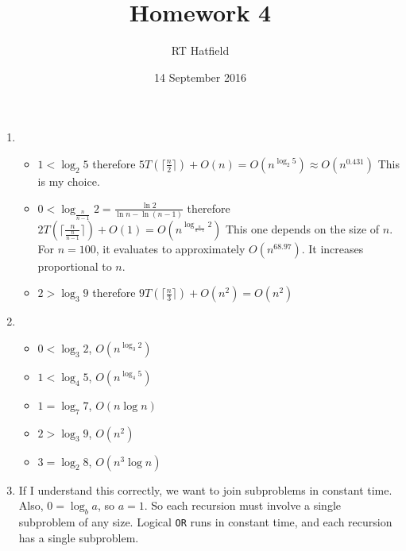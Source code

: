 \documentclass{article}
\title{Homework 4}
\author{RT Hatfield}
\date{14 September 2016}
\begin{document}
    \maketitle
    \begin{enumerate}
        \item \begin{itemize}
            \item $1 < \log_{2}{5}$ therefore $5T(\lceil\frac{n}{2}\rceil) + O(n) = O(n^{\log_{2}{5}}) \approx O(n^{0.431})$  This is my choice.
            \item $0 < \log_{\frac{n}{n-1}}{2} = \frac{\ln{2}}{\ln{n} - \ln{(n-1)}}$ therefore $2T(\lceil\frac{n}{\frac{n}{n-1}}\rceil) + O(1) = O(n^{\log_{\frac{n}{n-1}}{2}})$
            This one depends on the size of $n$.  For $n=100$, it evaluates to approximately $O(n^{68.97})$.  It increases proportional to $n$.
            \item $2 > \log_{3}{9}$ therefore $9T(\lceil\frac{n}{3}\rceil) + O(n^2) = O(n^2)$
        \end{itemize}
        \item \begin{itemize}
            \item $0 < \log_{3}{2}$, $O(n^{\log_{3}{2}})$
            \item $1 < \log_{4}{5}$, $O(n^{\log_{4}{5}})$
            \item $1 = \log_{7}{7}$, $O(n\log n)$
            \item $2 > \log_{3}{9}$, $O(n^2)$
            \item $3 = \log_{2}{8}$, $O(n^3\log n)$
        \end{itemize}
        \item If I understand this correctly, we want to join subproblems in constant time.  Also, $0 = \log_{b}{a}$, so $a = 1$. 
        So each recursion must involve a single subproblem of any size.  Logical \lstinline`OR` runs in constant time, and each recursion
        has a single subproblem. 

            \begin{procedure}[H]
            \end{procedure}
    \end{enumerate}
\end{document}
